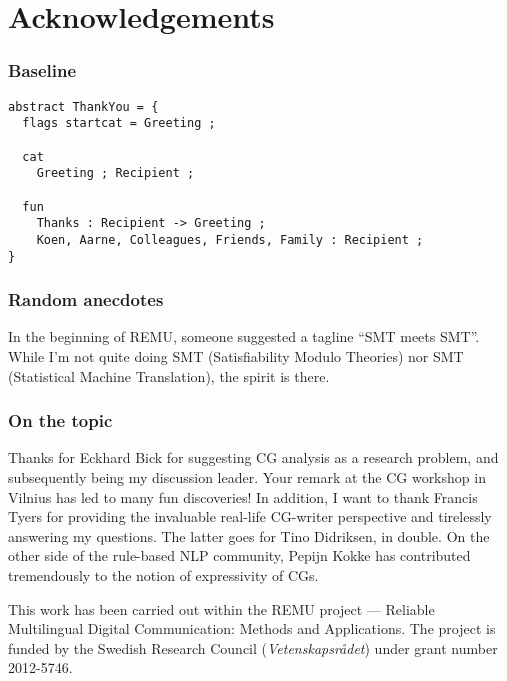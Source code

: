 \chapter*{Acknowledgements}\label{chp:acknowledgements}

\subsection*{Baseline}

\begin{verbatim}
abstract ThankYou = {
  flags startcat = Greeting ;

  cat 
    Greeting ; Recipient ;

  fun
    Thanks : Recipient -> Greeting ;
    Koen, Aarne, Colleagues, Friends, Family : Recipient ;
}
\end{verbatim}


\subsection*{Random anecdotes}

In the beginning of REMU, someone suggested a tagline ``SMT meets
SMT''. While I'm not quite doing SMT (Satisfiability Modulo Theories)
nor SMT (Statistical Machine Translation), the spirit is there.

\subsection*{On the topic}

Thanks for Eckhard Bick for suggesting CG analysis as a research
problem, and subsequently being my discussion leader. 
Your remark at the CG workshop in Vilnius has led to many fun discoveries!
In addition, I want to thank Francis Tyers for providing the invaluable real-life CG-writer perspective and tirelessly answering my questions. The latter goes for Tino Didriksen, in double. On the other side of the rule-based NLP community, Pepijn Kokke 
has contributed tremendously to the notion of expressivity of CGs.



\vfill\noindent
This work has been carried out within the REMU project — Reliable Multilingual Digital Communication: Methods and Applications.
The project is funded by the Swedish Research Council (\emph{Vetenskapsrådet}) under grant number 2012-5746.

